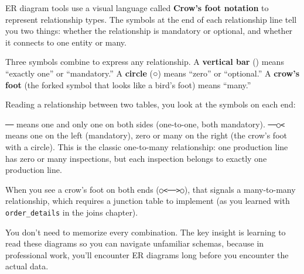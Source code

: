 \documentclass[
  letterpaper,
  DIV=11,
  numbers=noendperiod]{scrreprt}
\begin{document}
ER diagram tools use a visual language called \textbf{Crow's foot
notation} to represent relationship types. The symbols at the end of
each relationship line tell you two things: whether the relationship is
mandatory or optional, and whether it connects to one entity or many.

Three symbols combine to express any relationship. A \textbf{vertical
bar} (\textbar) means ``exactly one'' or ``mandatory.'' A
\textbf{circle} (○) means ``zero'' or ``optional.'' A \textbf{crow's
foot} (the forked symbol that looks like a bird's foot) means ``many.''

Reading a relationship between two tables, you look at the symbols on
each end:

\texttt{\textbar{}\textbar{}──\textbar{}\textbar{}} means one and only
one on both sides (one-to-one, both mandatory).
\texttt{\textbar{}\textbar{}──○\textless{}} means one on the left
(mandatory), zero or many on the right (the crow's foot with a circle).
This is the classic one-to-many relationship: one production line has
zero or many inspections, but each inspection belongs to exactly one
production line.

When you see a crow's foot on both ends
(\texttt{○\textless{}──\textgreater{}○}), that signals a many-to-many
relationship, which requires a junction table to implement (as you
learned with \texttt{order\_details} in the joins chapter).

You don't need to memorize every combination. The key insight is
learning to read these diagrams so you can navigate unfamiliar schemas,
because in professional work, you'll encounter ER diagrams long before
you encounter the actual data.
\end{document}
